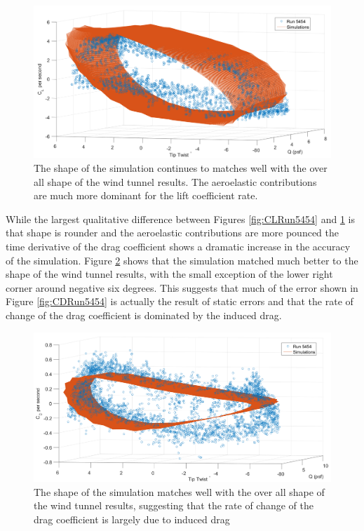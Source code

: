 \documentclass[11pt]{ucthesis}
\begin{document}
\begin{figure}[h]
\centering
\includegraphics[width=.75\linewidth]{Figures/diffCL5454.png}
\caption{The shape of the simulation continues to matches well with the over all shape of the wind tunnel results. The aeroelastic contributions are much more dominant for the lift coefficient rate.}
\label{fig:dCLdtRun5454}
\end{figure}

While the largest qualitative difference between Figures \ref{fig:CLRun5454} and \ref{fig:dCLdtRun5454} is that shape is rounder and the aeroelastic contributions are more pounced the time derivative of the drag coefficient shows a dramatic increase in the accuracy of the simulation. Figure \ref{fig:dCDdtRun5454} shows that the simulation matched much better to the shape of the wind tunnel results, with the small exception of the lower right corner around negative six degrees. This suggests that much of the error shown in Figure \ref{fig:CDRun5454} is actually the result of static errors and that the rate of change of the drag coefficient is dominated by the induced drag.

\begin{figure}[h]
\centering
\includegraphics[width=.75\linewidth]{Figures/diffCD5454.png}
\caption{The shape of the simulation matches well with the over all shape of the wind tunnel results, suggesting that the rate of change of the drag coefficient is largely due to induced drag}
\label{fig:dCDdtRun5454}
\end{figure}
\end{document}
